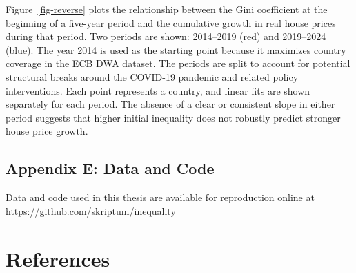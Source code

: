\documentclass[
  a4paper,
  DIV=11,
  numbers=noendperiod]{scrartcl}
\begin{document}
Figure~\ref{fig-reverse} plots the relationship between the Gini
coefficient at the beginning of a five-year period and the cumulative
growth in real house prices during that period. Two periods are shown:
2014--2019 (red) and 2019--2024 (blue). The year 2014 is used as the
starting point because it maximizes country coverage in the ECB DWA
dataset. The periods are split to account for potential structural
breaks around the COVID-19 pandemic and related policy interventions.
Each point represents a country, and linear fits are shown separately
for each period. The absence of a clear or consistent slope in either
period suggests that higher initial inequality does not robustly predict
stronger house price growth.

\newpage{}

\subsection*{Appendix E: Data and Code}\label{appendix-e-data-and-code}

Data and code used in this thesis are available for reproduction online
at \url{https://github.com/skriptum/inequality}

\newpage{}

\section*{References}\label{references}
\end{document}
